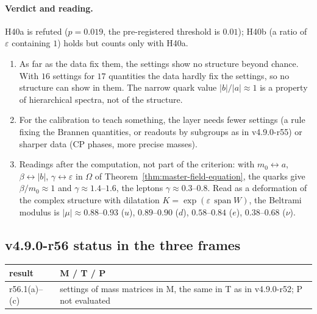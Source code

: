 \paragraph{Verdict and reading.}
H40a is refuted (\(p=0.019\), the pre-registered threshold is \(0.01\)); H40b (a ratio of \(\varepsilon\) containing \(1\)) holds but counts only with H40a.
\begin{enumerate}[leftmargin=2em]
\item As far as the data fix them, the settings show no structure beyond chance.  With \(16\) settings for \(17\) quantities the data hardly fix the
settings, so no structure can show in them.  The narrow quark value \(|b|/|a|\approx1\) is a property of hierarchical spectra, not of the structure.
\item For the calibration to teach something, the layer needs fewer settings (a rule fixing the Brannen quantities, or readouts by subgroups as in
v4.9.0-r55) or sharper data (CP phases, more precise masses).
\item Readings after the computation, not part of the criterion: with \(m_0\leftrightarrow a\), \(\beta\leftrightarrow|b|\), \(\gamma\leftrightarrow\varepsilon\) in
\(\Omega\) of Theorem~\ref{thm:master-field-equation}, the quarks give \(\beta/m_0\approx1\) and \(\gamma\approx1.4\)--\(1.6\), the leptons \(\gamma\approx0.3\)--\(0.8\).
Read as a deformation of the complex structure with dilatation \(K=\exp(\varepsilon\,\operatorname{span}W)\), the Beltrami modulus is
\(|\mu|\approx0.88\)--\(0.93\) (\(u\)), \(0.89\)--\(0.90\) (\(d\)), \(0.58\)--\(0.84\) (\(e\)), \(0.38\)--\(0.68\) (\(\nu\)).
\end{enumerate}

\subsection*{v4.9.0-r56 status in the three frames}
\label{subsec:v490-r56-frames}

\begin{center}
\small
\begin{tabular}{@{}>{\raggedright\arraybackslash}p{}>{\raggedright\arraybackslash}p{}@{}}
\toprule
result & M / T / P\\
\midrule
r56.1(a)--(c) & settings of mass matrices in M, the same in T as in v4.9.0-r52; P not evaluated\\
\bottomrule
\end{tabular}
\end{center}

